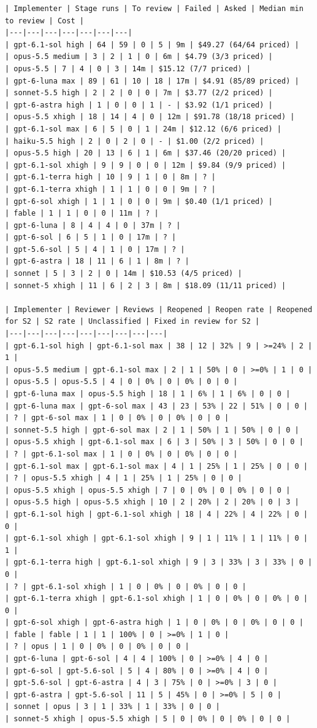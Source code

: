 \documentclass[11pt,a4paper]{article}
\begin{document}
{\tiny
\begin{verbatim}
| Implementer | Stage runs | To review | Failed | Asked | Median min to review | Cost |
|---|---|---|---|---|---|---|
| gpt-6.1-sol high | 64 | 59 | 0 | 5 | 9m | $49.27 (64/64 priced) |
| opus-5.5 medium | 3 | 2 | 1 | 0 | 6m | $4.79 (3/3 priced) |
| opus-5.5 | 7 | 4 | 0 | 3 | 14m | $15.12 (7/7 priced) |
| gpt-6-luna max | 89 | 61 | 10 | 18 | 17m | $4.91 (85/89 priced) |
| sonnet-5.5 high | 2 | 2 | 0 | 0 | 7m | $3.77 (2/2 priced) |
| gpt-6-astra high | 1 | 0 | 0 | 1 | - | $3.92 (1/1 priced) |
| opus-5.5 xhigh | 18 | 14 | 4 | 0 | 12m | $91.78 (18/18 priced) |
| gpt-6.1-sol max | 6 | 5 | 0 | 1 | 24m | $12.12 (6/6 priced) |
| haiku-5.5 high | 2 | 0 | 2 | 0 | - | $1.00 (2/2 priced) |
| opus-5.5 high | 20 | 13 | 6 | 1 | 6m | $37.46 (20/20 priced) |
| gpt-6.1-sol xhigh | 9 | 9 | 0 | 0 | 12m | $9.84 (9/9 priced) |
| gpt-6.1-terra high | 10 | 9 | 1 | 0 | 8m | ? |
| gpt-6.1-terra xhigh | 1 | 1 | 0 | 0 | 9m | ? |
| gpt-6-sol xhigh | 1 | 1 | 0 | 0 | 9m | $0.40 (1/1 priced) |
| fable | 1 | 1 | 0 | 0 | 11m | ? |
| gpt-6-luna | 8 | 4 | 4 | 0 | 37m | ? |
| gpt-6-sol | 6 | 5 | 1 | 0 | 17m | ? |
| gpt-5.6-sol | 5 | 4 | 1 | 0 | 17m | ? |
| gpt-6-astra | 18 | 11 | 6 | 1 | 8m | ? |
| sonnet | 5 | 3 | 2 | 0 | 14m | $10.53 (4/5 priced) |
| sonnet-5 xhigh | 11 | 6 | 2 | 3 | 8m | $18.09 (11/11 priced) |

| Implementer | Reviewer | Reviews | Reopened | Reopen rate | Reopened for S2 | S2 rate | Unclassified | Fixed in review for S2 |
|---|---|---|---|---|---|---|---|---|
| gpt-6.1-sol high | gpt-6.1-sol max | 38 | 12 | 32% | 9 | >=24% | 2 | 1 |
| opus-5.5 medium | gpt-6.1-sol max | 2 | 1 | 50% | 0 | >=0% | 1 | 0 |
| opus-5.5 | opus-5.5 | 4 | 0 | 0% | 0 | 0% | 0 | 0 |
| gpt-6-luna max | opus-5.5 high | 18 | 1 | 6% | 1 | 6% | 0 | 0 |
| gpt-6-luna max | gpt-6-sol max | 43 | 23 | 53% | 22 | 51% | 0 | 0 |
| ? | gpt-6-sol max | 1 | 0 | 0% | 0 | 0% | 0 | 0 |
| sonnet-5.5 high | gpt-6-sol max | 2 | 1 | 50% | 1 | 50% | 0 | 0 |
| opus-5.5 xhigh | gpt-6.1-sol max | 6 | 3 | 50% | 3 | 50% | 0 | 0 |
| ? | gpt-6.1-sol max | 1 | 0 | 0% | 0 | 0% | 0 | 0 |
| gpt-6.1-sol max | gpt-6.1-sol max | 4 | 1 | 25% | 1 | 25% | 0 | 0 |
| ? | opus-5.5 xhigh | 4 | 1 | 25% | 1 | 25% | 0 | 0 |
| opus-5.5 xhigh | opus-5.5 xhigh | 7 | 0 | 0% | 0 | 0% | 0 | 0 |
| opus-5.5 high | opus-5.5 xhigh | 10 | 2 | 20% | 2 | 20% | 0 | 3 |
| gpt-6.1-sol high | gpt-6.1-sol xhigh | 18 | 4 | 22% | 4 | 22% | 0 | 0 |
| gpt-6.1-sol xhigh | gpt-6.1-sol xhigh | 9 | 1 | 11% | 1 | 11% | 0 | 1 |
| gpt-6.1-terra high | gpt-6.1-sol xhigh | 9 | 3 | 33% | 3 | 33% | 0 | 0 |
| ? | gpt-6.1-sol xhigh | 1 | 0 | 0% | 0 | 0% | 0 | 0 |
| gpt-6.1-terra xhigh | gpt-6.1-sol xhigh | 1 | 0 | 0% | 0 | 0% | 0 | 0 |
| gpt-6-sol xhigh | gpt-6-astra high | 1 | 0 | 0% | 0 | 0% | 0 | 0 |
| fable | fable | 1 | 1 | 100% | 0 | >=0% | 1 | 0 |
| ? | opus | 1 | 0 | 0% | 0 | 0% | 0 | 0 |
| gpt-6-luna | gpt-6-sol | 4 | 4 | 100% | 0 | >=0% | 4 | 0 |
| gpt-6-sol | gpt-5.6-sol | 5 | 4 | 80% | 0 | >=0% | 4 | 0 |
| gpt-5.6-sol | gpt-6-astra | 4 | 3 | 75% | 0 | >=0% | 3 | 0 |
| gpt-6-astra | gpt-5.6-sol | 11 | 5 | 45% | 0 | >=0% | 5 | 0 |
| sonnet | opus | 3 | 1 | 33% | 1 | 33% | 0 | 0 |
| sonnet-5 xhigh | opus-5.5 xhigh | 5 | 0 | 0% | 0 | 0% | 0 | 0 |


\end{verbatim}}
\end{document}
